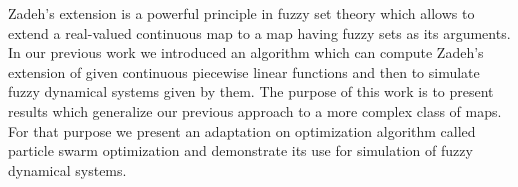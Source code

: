 
Zadeh's extension is a powerful principle in fuzzy set theory which allows to extend a real-valued continuous map to a map having fuzzy sets as its arguments. In our previous work we introduced an algorithm which can compute Zadeh’s extension of given continuous piecewise linear functions and then to simulate fuzzy dynamical systems given by them. The purpose of this work is to present results which generalize our previous approach to a more complex class of maps. For that purpose we present an adaptation on optimization algorithm called particle swarm optimization and demonstrate its use for simulation of fuzzy dynamical systems.


